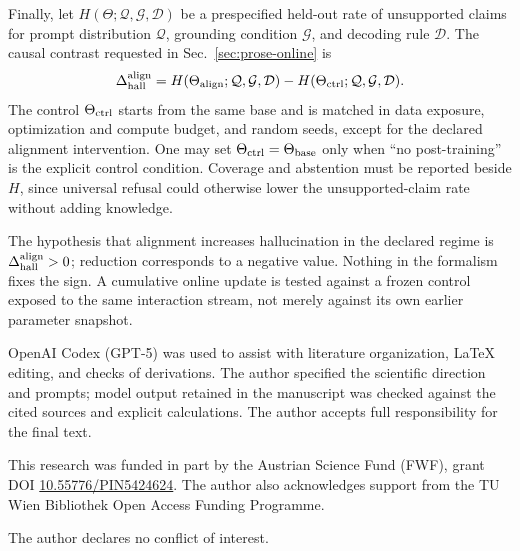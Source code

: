 \documentclass[
  aps,
  reprint,
  superscriptaddress,
  floatfix,
  nofootinbib,
  longbibliography
]{revtex4-2}
\begin{document}
Finally, let $H(\Theta;\mathcal Q,\mathcal G,\mathcal D)$ be a prespecified
held-out rate of unsupported claims for prompt distribution $\mathcal Q$,
grounding condition $\mathcal G$, and decoding rule $\mathcal D$.  The causal
contrast requested in Sec.~\ref{sec:prose-online} is
%
\begin{equation}
\label{eq:app-hallucination-test}
\Delta_{\rm hall}^{\rm align}
=H(\Theta_{\rm align};\mathcal Q,\mathcal G,\mathcal D)
-H(\Theta_{\rm ctrl};\mathcal Q,\mathcal G,\mathcal D).
\end{equation}
%
The control $\Theta_{\rm ctrl}$ starts from the same base and is matched in
data exposure, optimization and compute budget, and random seeds, except for
the declared alignment intervention.  One may set
$\Theta_{\rm ctrl}=\Theta_{\rm base}$ only when ``no post-training'' is the
explicit control condition.  Coverage and abstention must be reported beside
$H$, since universal refusal could otherwise lower the unsupported-claim rate
without adding knowledge.

The hypothesis that alignment increases hallucination in the declared regime
is $\Delta_{\rm hall}^{\rm align}>0$; reduction corresponds to a negative
value.  Nothing in the formalism fixes the sign.  A cumulative online update
is tested against a frozen control exposed to the same interaction stream,
not merely against its own earlier parameter snapshot.

\begin{acknowledgments}
OpenAI Codex (GPT-5) was used to assist with literature organization, \LaTeX{}
editing, and checks of derivations.  The author specified the scientific
direction and prompts; model output retained in the manuscript was checked
against the cited sources and explicit calculations.  The author accepts full
responsibility for the final text.

This research was funded in part by the Austrian Science Fund (FWF), grant DOI
\href{https://doi.org/10.55776/PIN5424624}{10.55776/PIN5424624}.
The author also acknowledges support from the TU Wien Bibliothek Open Access
Funding Programme.

The author declares no conflict of interest.
\end{acknowledgments}

\clearpage


\end{document}
